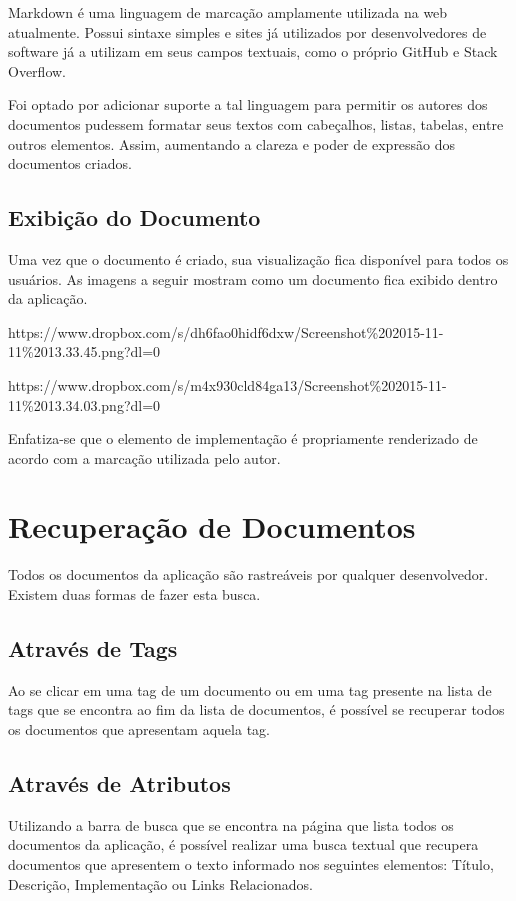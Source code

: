 Markdown é uma linguagem de marcação amplamente utilizada na web atualmente. Possui sintaxe simples e sites já utilizados por desenvolvedores de software já a utilizam em seus campos textuais, como o próprio GitHub e Stack Overflow.

Foi optado por adicionar suporte a tal linguagem para permitir os autores dos documentos pudessem formatar seus textos com cabeçalhos, listas, tabelas, entre outros elementos. Assim, aumentando a clareza e poder de expressão dos documentos criados.

\subsection{Exibição do Documento}

Uma vez que o documento é criado, sua visualização fica disponível para todos os usuários. As imagens a seguir mostram como um documento fica exibido dentro da aplicação.

https://www.dropbox.com/s/dh6fao0hidf6dxw/Screenshot\%202015-11-11\%2013.33.45.png?dl=0

https://www.dropbox.com/s/m4x930cld84ga13/Screenshot\%202015-11-11\%2013.34.03.png?dl=0

Enfatiza-se que o elemento de implementação é propriamente renderizado de acordo com a marcação utilizada pelo autor.

\section{Recuperação de Documentos}

Todos os documentos da aplicação são rastreáveis por qualquer desenvolvedor. Existem duas formas de fazer esta busca.

\subsection{Através de Tags}

Ao se clicar em uma tag de um documento ou em uma tag presente na lista de tags que se encontra ao fim da lista de documentos, é possível se recuperar todos os documentos que apresentam aquela tag.

\subsection{Através de Atributos}

Utilizando a barra de busca que se encontra na página que lista todos os documentos da aplicação, é possível realizar uma busca textual que recupera documentos que apresentem o texto informado nos seguintes elementos: Título, Descrição, Implementação ou Links Relacionados.

